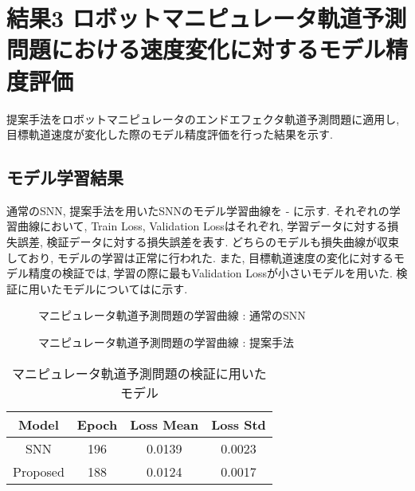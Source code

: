 \section{結果3 ロボットマニピュレータ軌道予測問題における速度変化に対するモデル精度評価} \label{sec:result3}
提案手法をロボットマニピュレータのエンドエフェクタ軌道予測問題に適用し, 目標軌道速度が変化した際のモデル精度評価を行った結果を示す.

\subsection{モデル学習結果}
通常のSNN, 提案手法を用いたSNNのモデル学習曲線を - に示す.
それぞれの学習曲線において, Train Loss, Validation Lossはそれぞれ, 学習データに対する損失誤差, 検証データに対する損失誤差を表す.
どちらのモデルも損失曲線が収束しており, モデルの学習は正常に行われた.
また, 目標軌道速度の変化に対するモデル精度の検証では, 学習の際に最もValidation Lossが小さいモデルを用いた.
検証に用いたモデルについてはに示す.
\begin{figure}[htb]
    \centering
    
    \caption{マニピュレータ軌道予測問題の学習曲線 : 通常のSNN}
    \label{fig:result3:1:snn}
\end{figure}
\begin{figure}[htb]
    \centering
    
    \caption{マニピュレータ軌道予測問題の学習曲線 : 提案手法}
    \label{fig:result3:1:proposed}
\end{figure}

\begin{table}[htb]
    \centering
    \caption{マニピュレータ軌道予測問題の検証に用いたモデル}
    \label{tab:result3:model:parameter}
    \begin{tabular}{cccc}
        \hline
        \textbf{Model}& \textbf{Epoch} & \textbf{Loss Mean} & \textbf{Loss Std}\\
        \hline
        SNN &  196 & 0.0139 & 0.0023\\ %
        Proposed & 188 & 0.0124 & 0.0017\\
        \hline
    \end{tabular}
\end{table}
\clearpage


